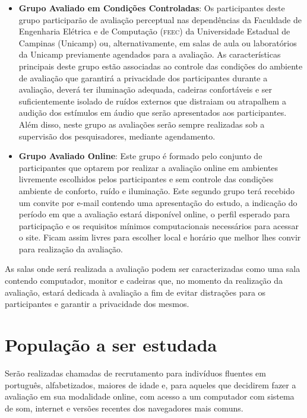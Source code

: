 \documentclass[a4paper,11pt,titlepage,singlespacing]{article}
\begin{document}
\begin{itemize}
    \item \textbf{Grupo Avaliado em Condições Controladas}: Os participantes deste grupo participarão de avaliação perceptual nas dependências da Faculdade de Engenharia Elétrica e de Computação (\textsc{feec}) da Universidade Estadual de Campinas (Unicamp) ou, alternativamente, em salas de aula ou laboratórios da Unicamp previamente agendados para a avaliação. As características principais deste grupo estão associadas ao controle das condições do ambiente de avaliação que garantirá a privacidade dos participantes durante a avaliação, deverá ter iluminação adequada, cadeiras confortáveis e ser suficientemente isolado de ruídos externos que distraiam ou atrapalhem a audição dos estímulos em áudio que serão apresentados aos participantes. Além disso, neste grupo as avaliações serão sempre realizadas sob a supervisão dos pesquisadores, mediante agendamento. 
    \item \textbf{Grupo Avaliado Online}: Este grupo é formado pelo conjunto de participantes que optarem por realizar a avaliação online em ambientes livremente escolhidos pelos participantes e sem controle das condições ambiente de conforto, ruído e iluminação. Este segundo grupo terá recebido um convite por e-mail contendo uma apresentação do estudo, a indicação do período em que a avaliação estará disponível online, o perfil esperado para participação e os requisitos mínimos computacionais necessários para acessar o site. Ficam assim livres para escolher local e horário que melhor lhes convir para realização da avaliação.
\end{itemize}

\noindent As salas onde será realizada a avaliação podem ser caracterizadas como uma sala contendo computador, monitor e cadeiras que, no momento da realização da avaliação, estará dedicada à avaliação a fim de evitar distrações para os participantes e garantir a privacidade dos mesmos.

\section{População a ser estudada}

\noindent Serão realizadas chamadas de recrutamento para indivíduos fluentes em português, alfabetizados, maiores de idade e, para aqueles que decidirem fazer a avaliação em sua modalidade online, com acesso a um computador com sistema de som, internet e versões recentes dos navegadores mais comuns.
\end{document}
